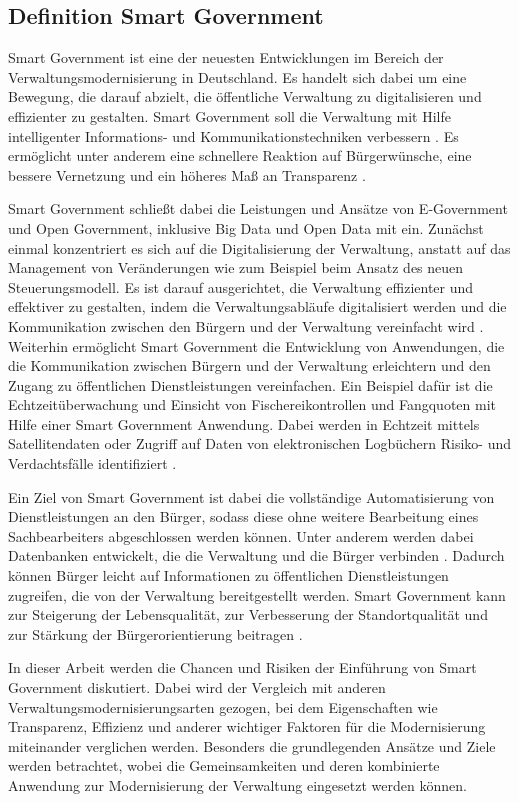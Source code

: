 \subsection{Definition Smart Government}
Smart Government ist eine der neuesten Entwicklungen im Bereich der Verwaltungsmodernisierung in Deutschland. 
Es handelt sich dabei um eine Bewegung, die darauf abzielt, die öffentliche Verwaltung zu digitalisieren und effizienter zu gestalten. 
Smart Government soll die Verwaltung mit Hilfe intelligenter Informations- und Kommunikationstechniken verbessern \citep[][S.178]{von_Lucke_2016}.
Es ermöglicht unter anderem eine schnellere Reaktion auf Bürgerwünsche, eine bessere Vernetzung und ein höheres Maß an Transparenz \citep[Vgl][S.87]{Kersting2017}.
\par
Smart Government schließt dabei die Leistungen und Ansätze von E-Government und Open Government, inklusive Big Data und Open Data mit ein.
Zunächst einmal konzentriert es sich auf die Digitalisierung der Verwaltung, anstatt auf das Management von Veränderungen wie zum Beispiel beim Ansatz des neuen Steuerungsmodell. 
Es ist darauf ausgerichtet, die Verwaltung effizienter und effektiver zu gestalten, indem die Verwaltungsabläufe digitalisiert werden und die Kommunikation zwischen den Bürgern und der Verwaltung vereinfacht wird \citep[Vgl.][]{von_Lucke_2016}.
Weiterhin ermöglicht Smart Government die Entwicklung von Anwendungen, die die Kommunikation zwischen Bürgern und der Verwaltung erleichtern und den Zugang zu öffentlichen Dienstleistungen vereinfachen. 
Ein Beispiel dafür ist die Echtzeitüberwachung und Einsicht von Fischereikontrollen und Fangquoten mit Hilfe einer Smart Government Anwendung.
Dabei werden in Echtzeit mittels Satellitendaten oder Zugriff auf Daten von elektronischen Logbüchern Risiko- und Verdachtsfälle identifiziert \citep[][]{LandwirtschaftundErnaehrung2023}. 
\par
Ein Ziel von Smart Government ist dabei die vollständige Automatisierung von Dienstleistungen an den Bürger, sodass diese ohne weitere Bearbeitung eines Sachbearbeiters abgeschlossen werden können.
Unter anderem werden dabei Datenbanken entwickelt, die die Verwaltung und die Bürger verbinden \citep[Vgl.][]{von_Lucke_2016}. 
Dadurch können Bürger leicht auf Informationen zu öffentlichen Dienstleistungen zugreifen, die von der Verwaltung bereitgestellt werden.
\glqq{}Smart Government kann zur Steigerung der Lebensqualität, zur Verbesserung der Standortqualität und zur Stärkung der Bürgerorientierung beitragen\grqq{} \citep[][]{von_Lucke_2016}. 
\par
In dieser Arbeit werden die Chancen und Risiken der Einführung von Smart Government diskutiert.
Dabei wird der Vergleich mit anderen Verwaltungsmodernisierungsarten gezogen, bei dem Eigenschaften wie Transparenz, Effizienz und anderer wichtiger Faktoren für die Modernisierung miteinander verglichen werden.
Besonders die grundlegenden Ansätze und Ziele werden betrachtet, wobei die Gemeinsamkeiten und deren kombinierte Anwendung zur Modernisierung der Verwaltung eingesetzt werden können.

